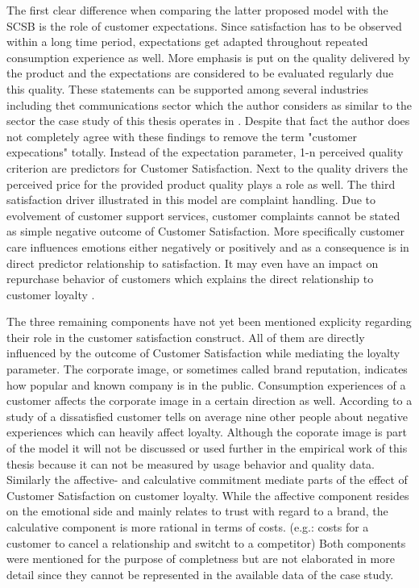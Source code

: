 The first clear difference when comparing the latter proposed model with the SCSB is the role of customer expectations. Since satisfaction has to be observed within a long time period, expectations get adapted throughout repeated consumption experience as well. More emphasis is put on the quality delivered by the product and the expectations are considered to be evaluated regularly due this quality. These statements can be supported among several industries including thet communications sector which the author considers as similar to the sector the case study of this thesis operates in \cite{johnson1996expectations} \cite{fornell1996american}. Despite that fact the author does not completely agree with these findings to remove the term "customer expecations" totally. Instead of the expectation parameter, 1-n perceived quality criterion are predictors for Customer Satisfaction. Next to the quality drivers the perceived price for the provided product quality plays a role as well. The third satisfaction driver illustrated in this model are complaint handling. Due to evolvement of customer support services, customer complaints cannot be stated as simple negative outcome of Customer Satisfaction. More specifically customer care influences emotions either negatively or positively and as a consequence is in direct predictor relationship to satisfaction. It may even have an impact on repurchase behavior of customers which explains the direct relationship to customer loyalty \cite{johnson2001evolution}. 

The three remaining components have not yet been mentioned explicity regarding their role in the customer satisfaction construct. All of them are directly influenced by the outcome of Customer Satisfaction while mediating the loyalty parameter. The corporate image, or sometimes called brand reputation, indicates how popular and known company is in the public. Consumption experiences of a customer affects the corporate image in a certain direction as well. According to a study of \cite{hussain2015service} a dissatisfied customer tells on average nine other people about negative experiences which can heavily affect loyalty. Although the coporate image is part of the model it will not be discussed or used further in the empirical work of this thesis because it can not be measured by usage behavior and quality data. Similarly the affective- and calculative commitment mediate parts of the effect of Customer Satisfaction on customer loyalty. While the affective component resides on the emotional side and mainly relates to trust with regard to a brand, the calculative component is more rational in terms of costs. (e.g.: costs for a customer to cancel a relationship and switcht to a competitor) \cite{johnson2001evolution} Both components were mentioned for the purpose of completness but are not elaborated in more detail since they cannot be represented in the available data of the case study. 

